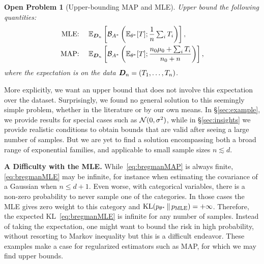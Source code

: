 \documentclass[twoside]{article}
\newtheorem{problem}{Open Problem}
\newcommand*{\expect}[2][]{\ensuremath{\mathbb{E}_{#1} \left[ #2 \right] }} %
\newcommand{\logpart}{A}
\newcommand{\bregmanconj}{\cB_{\logpart^*}}
\newcommand{\nat}{\theta}
\newcommand{\m}{\mu}
\begin{document}
\begin{problem}[Upper-bounding MAP and MLE]
Upper bound the following quantities:
\begin{align}
	\label{eq:bregmanMLE}
	\text{MLE: } \quad &\expect[\mD_n]{\bregmanconj \left (\E_{\nat^*} [T] ;  \inv{n}  \smallsum_i T_i \right )}, \\
	\label{eq:bregmanMAP}
	\text{MAP: } \quad &\expect[\mD_n]{\bregmanconj \left (\E_{\nat^*} [T] ; \frac{n_0 \m_0 + \smallsum_i T_i}{n_0+n} \right )},
\end{align}
where the expectation is on the data ${\bm{D}}_n = (T_1, \dots, T_n)$.
\end{problem}

More explicitly, we want an upper bound that does not involve this expectation over the dataset.
Surprisingly, we found no general solution to this seemingly simple problem, whether in the literature or by our own means.
In \S\ref{sec:example}, we provide results for special cases such as ${\mathcal N}(0, \sigma^2)$,
while in \S\ref{sec:insights} we provide realistic conditions to obtain bounds that are valid after seeing a large number of samples.
But we are yet to find a solution encompassing both a broad range of exponential families,
and applicable to small sample sizes $n \lesssim d$.

{\bf A Difficulty with the MLE.}
While~\eqref{eq:bregmanMAP} is always finite, \eqref{eq:bregmanMLE} may be infinite,
for instance when estimating the covariance of a Gaussian when $n \leq d + 1$.
Even worse, with categorical variables, there is a non-zero probability to never sample one of the categories.
In those cases the MLE gives zero weight to this category and $\KL(p_{\nat^*} \,\Vert\, p_\text{MLE} ) = +\infty$.
Therefore, the expected KL~\eqref{eq:bregmanMLE} is infinite for any number of samples.
Instead of taking the expectation, one might want to bound the risk in high probability,
without resorting to Markov inequality but this is a difficult endeavor.
These examples make a case for regularized estimators such as MAP,
for which we may find upper bounds.
\end{document}
